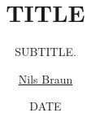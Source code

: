 \documentclass[18pt]{beamer}
\title{TITLE}
\subtitle{SUBTITLE.}
\author{\underline{Nils Braun}}
\date{DATE}
\institute{IEKP - KIT}
\begin{document}
  
  \begin{frame}
  \titlepage
  \end{frame}
\end{document}
